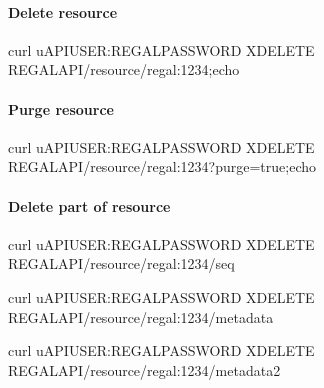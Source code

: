 \documentclass[letterpaper,10pt,english]{sphinxmanual}
\begin{document}
\paragraph{Delete resource}
\label{\detokenize{api-toscience:delete-resource}}\label{\detokenize{api-toscience:id23}}
\begin{sphinxVerbatim}[commandchars=\\\{\}]
curl \PYGZhy{}u\PYGZdl{}API\PYGZus{}USER:\PYGZdl{}REGAL\PYGZus{}PASSWORD \PYGZhy{}XDELETE \PYGZdq{}\PYGZdl{}REGAL\PYGZus{}API/resource/regal:1234\PYGZdq{};echo
\end{sphinxVerbatim}


\paragraph{Purge resource}
\label{\detokenize{api-toscience:purge-resource}}\label{\detokenize{api-toscience:id24}}
\begin{sphinxVerbatim}[commandchars=\\\{\}]
curl \PYGZhy{}u\PYGZdl{}API\PYGZus{}USER:\PYGZdl{}REGAL\PYGZus{}PASSWORD \PYGZhy{}XDELETE \PYGZdq{}\PYGZdl{}REGAL\PYGZus{}API/resource/regal:1234?purge=true\PYGZdq{};echo
\end{sphinxVerbatim}


\paragraph{Delete part of resource}
\label{\detokenize{api-toscience:delete-part-of-resource}}\label{\detokenize{api-toscience:id25}}
\begin{sphinxVerbatim}[commandchars=\\\{\}]
curl \PYGZhy{}u\PYGZdl{}API\PYGZus{}USER:\PYGZdl{}REGAL\PYGZus{}PASSWORD \PYGZhy{}XDELETE \PYGZdl{}REGAL\PYGZus{}API/resource/regal:1234/seq
\end{sphinxVerbatim}

\begin{sphinxVerbatim}[commandchars=\\\{\}]
curl \PYGZhy{}u\PYGZdl{}API\PYGZus{}USER:\PYGZdl{}REGAL\PYGZus{}PASSWORD \PYGZhy{}XDELETE \PYGZdl{}REGAL\PYGZus{}API/resource/regal:1234/metadata
\end{sphinxVerbatim}

\begin{sphinxVerbatim}[commandchars=\\\{\}]
curl \PYGZhy{}u\PYGZdl{}API\PYGZus{}USER:\PYGZdl{}REGAL\PYGZus{}PASSWORD \PYGZhy{}XDELETE \PYGZdl{}REGAL\PYGZus{}API/resource/regal:1234/metadata2
\end{sphinxVerbatim}
\end{document}
